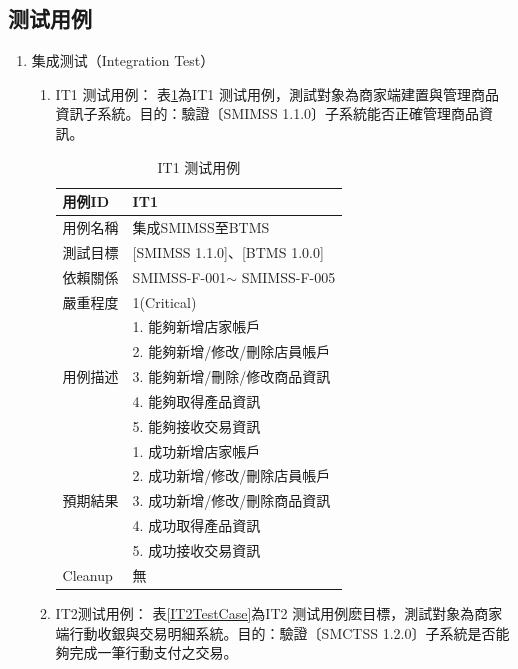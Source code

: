 		\subsection{测试用例}
			\begin{enumerate}

			\item 集成测试（Integration Test）
				\begin{enumerate}

				\item IT1 测试用例：
					表\ref{IT1TestCase}為IT1 测试用例，測試對象為商家端建置與管理商品資訊子系統。目的：驗證〔SMIMSS 1.1.0〕子系統能否正確管理商品資訊。

					\begin{table}[!htbp]
					\centering
					\caption{IT1 测试用例}
					\label{IT1TestCase}
					\begin{tabular}{|l|l|}
					\hline
					用例ID & IT1 \\ \hline
					用例名稱 & 集成SMIMSS至BTMS \\ \hline
					測試目標 & {[}SMIMSS 1.1.0{]}、{[}BTMS 1.0.0{]} \\ \hline
					依賴關係 & SMIMSS-F-001$\sim$ SMIMSS-F-005 \\ \hline
					嚴重程度 & 1(Critical) \\ \hline
					\multirow{5}{*}{用例描述} & 1.     能夠新增店家帳戶 \\ \cline{2-2} 
					 & 2.     能夠新增/修改/刪除店員帳戶 \\ \cline{2-2} 
					 & 3.     能夠新增/刪除/修改商品資訊 \\ \cline{2-2} 
					 & 4.     能夠取得產品資訊 \\ \cline{2-2} 
					 & 5.     能夠接收交易資訊 \\ \hline
					\multirow{5}{*}{預期結果} & 1.     成功新增店家帳戶 \\ \cline{2-2} 
					 & 2.     成功新增/修改/刪除店員帳戶 \\ \cline{2-2} 
					 & 3.     成功新增/修改/刪除商品資訊 \\ \cline{2-2} 
					 & 4.     成功取得產品資訊 \\ \cline{2-2} 
					 & 5.     成功接收交易資訊 \\ \hline
					Cleanup & 無 \\ \hline
					\end{tabular}
					\end{table}


				\item IT2测试用例：
					表\ref{IT2TestCase}為IT2 测试用例麽目標，測試對象為商家端行動收銀與交易明細系統。目的：驗證〔SMCTSS 1.2.0〕子系統是否能夠完成一筆行動支付之交易。


\end{enumerate}
\end{enumerate}

